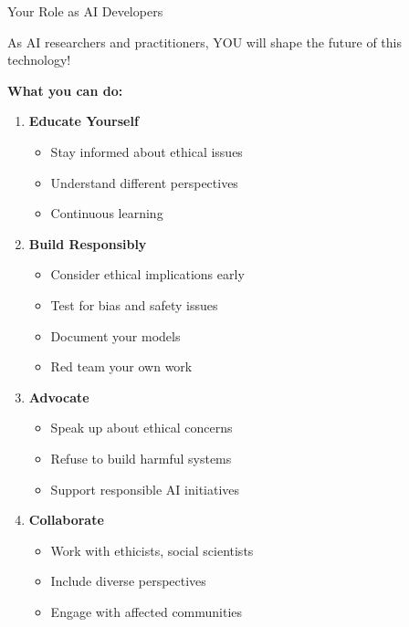 \documentclass[aspectratio=169]{beamer}
\begin{document}
\begin{frame}[shrink=10]{Your Role as AI Developers 👨‍💻👩‍💻}
\begin{warningbox}
As AI researchers and practitioners, YOU will shape the future of this technology!
\end{warningbox}

\vspace{0.5em}

\textbf{What you can do:}

\begin{enumerate}\setlength{\itemsep}{0pt}
    \item \textbf{Educate Yourself}
    \begin{itemize}\setlength{\itemsep}{0pt}
        \item Stay informed about ethical issues
        \item Understand different perspectives
        \item Continuous learning
    \end{itemize}

    \item \textbf{Build Responsibly}
    \begin{itemize}\setlength{\itemsep}{0pt}
        \item Consider ethical implications early
        \item Test for bias and safety issues
        \item Document your models
        \item Red team your own work
    \end{itemize}

    \item \textbf{Advocate}
    \begin{itemize}\setlength{\itemsep}{0pt}
        \item Speak up about ethical concerns
        \item Refuse to build harmful systems
        \item Support responsible AI initiatives
    \end{itemize}

    \item \textbf{Collaborate}
    \begin{itemize}\setlength{\itemsep}{0pt}
        \item Work with ethicists, social scientists
        \item Include diverse perspectives
        \item Engage with affected communities
    \end{itemize}
\end{enumerate}
\end{frame}
\end{document}
